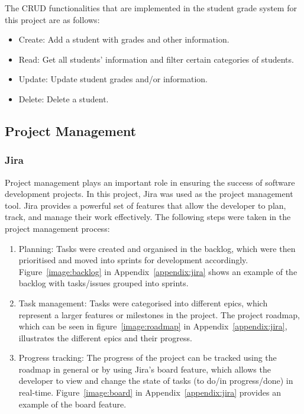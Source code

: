 The CRUD functionalities that are implemented in the student grade system for this project are as follows:

\begin{itemize}
\item Create: Add a student with grades and other information.
\item Read: Get all students' information and filter certain categories of students.
\item Update: Update student grades and/or information.
\item Delete: Delete a student.
\end{itemize}

\subsection{Project Management}
\subsubsection{Jira}

Project management plays an important role in ensuring the success of software development projects. In this project, Jira was used as the project management tool. Jira provides a powerful set of features that allow the developer to plan, track, and manage their work effectively. The following steps were taken in the project management process:

\begin{enumerate}
  \item Planning: Tasks were created and organised in the backlog, which were then prioritised and moved into sprints for development accordingly. Figure~\ref{image:backlog} in Appendix~\ref{appendix:jira} shows an example of the backlog with tasks/issues grouped into sprints.
  \item Task management: Tasks were  categorised into different epics, which represent a larger features or milestones in the project. The project roadmap, which can be seen in figure~\ref{image:roadmap} in Appendix~\ref{appendix:jira}, illustrates the different epics and their progress.
  \item Progress tracking: The progress of the project can be tracked using the roadmap in general or by using Jira's board feature, which allows the developer to view and change the state of tasks (to do/in progress/done) in real-time. Figure~\ref{image:board} in Appendix~\ref{appendix:jira} provides an example of the board feature. 
\end{enumerate}
